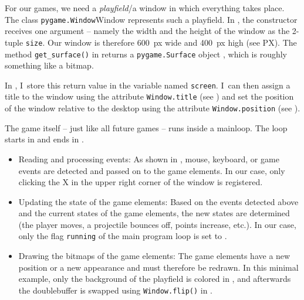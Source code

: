 For our games, we need a \emph{playfield}/a window in which everything takes place. The class \texttt{pygame.Window}{Window}
represents such a playfield. In , the constructor receives one argument -- namely the width and the height of the window as the 2-tuple
\texttt{size}. Our window is therefore \SI{600}{px} wide and \SI{400}{px} high
(see \Gls{PX}). The method \texttt{get\_surface()}
in  returns a \texttt{pygame.Surface} object , which is roughly something like a \gls{bitmap}.

In , I~store this return value in the
\gls{variable} named \texttt{screen}. I~can then assign a title to the window using the attribute \texttt{Window.title} (see ) and set the position of the window relative to the desktop using the attribute \texttt{Window.po\-si\-tion} (see ).

The game itself -- just like all future games -- runs inside a \gls{mainloop}. The loop starts in  and ends in . 

\begin{hintbox}
\begin{itemize}
	\item Reading and processing events: As shown in , mouse, keyboard, or game events are detected and passed on to the game elements. In our case, only clicking the X in the upper right corner of the window is registered.

	\item Updating the state of the game elements: Based on the events detected above and the current states of the game elements, the new states are determined (the player moves, a projectile bounces off, points increase, etc.). In our case, only the \gls{flag} \texttt{running} of the main program loop is set to \false.
	
	\item Drawing the bitmaps of the game elements:	The game elements have a new position or a new appearance and must therefore be redrawn. In this minimal example, only the background of the playfield is colored in , and afterwards the \gls{doublebuffer} is swapped using \texttt{Window.flip()} in .
\end{itemize}
\end{hintbox}


